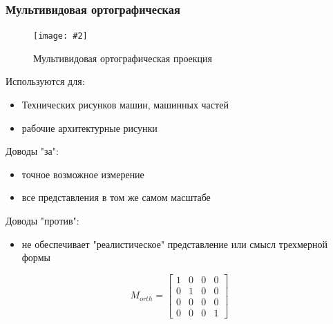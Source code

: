 \documentclass[a4paper, 14pt]{extarticle}
\newcommand{\screenshot}[3]{
	\begin{figure}[h]
		\centering
		\texttt{[image: \#2]}
		\caption{#3}
	\end{figure}
}
\begin{document}
\subsubsection{Мультивидовая ортографическая}
\screenshot{width=9cm}{l5/S038.jpg}{Мультивидовая ортографическая проекция}
Используются для:
\begin{itemize}
	\item Технических рисунков машин, машинных частей
	\item рабочие архитектурные рисунки
\end{itemize}

Доводы "за":
\begin{itemize}
	\item точное возможное измерение
	\item все представления в том же самом масштабе
\end{itemize}

Доводы "против":
\begin{itemize}
	\item не обеспечивает "реалистическое" представление или смысл трехмерной формы
\end{itemize}

$$
M_{orth} = \begin{bmatrix}
1 & 0 & 0 & 0\\
0 & 1 & 0 & 0\\
0 & 0 & 0 & 0\\
0 & 0 & 0 & 1
\end{bmatrix} 
$$
\end{document}
